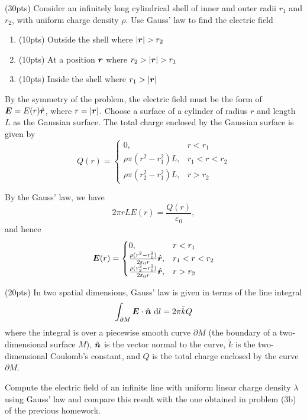\documentclass{article}
\begin{document}
\begin{problem}
(30pts) Consider an infinitely long cylindrical shell of inner and outer radii $r_1$ and $r_2$, with uniform charge density $\rho$. Use Gauss' law to find the electric field
\begin{enumerate}[label=(\alph*)]
    \item (10pts) Outside the shell where $|\boldsymbol{r}| > r_2$
    \item (10pts) At a position $\boldsymbol{r}$ where $r_2 > |\boldsymbol{r}| > r_1$
    \item (10pts) Inside the shell where $r_1 > |\boldsymbol{r}|$
\end{enumerate}
\end{problem}

\begin{solution}
  By the symmetry of the problem, the electric field must be the form of \( \boldsymbol{E}=E(r) \hat{\boldsymbol{r}} \), where \( r=|\boldsymbol{r}| \). Choose a surface of a cylinder of radius \( r \) and length \( L \) as the Gaussian surface. The total charge enclosed by the Gaussian surface is given by
  \[ Q(r)=\begin{cases}
    0,& r<r_1\\
    \rho\pi (r^2-r_1^2)L, & r_1<r<r_2\\
    \rho\pi (r_2^2-r_1^2)L, & r>r_2
  \end{cases} \]

  By the Gauss' law, we have
  \[ 2\pi r L E(r) = \frac{Q(r)}{\varepsilon_0}, \]
  and hence
  \[ \boldsymbol{E}(r) = \begin{cases}
    0, & r<r_1 \\
    \frac{\rho (r^2-r_1^2)}{2\varepsilon_0 r}\hat{\boldsymbol{r}}, & r_1<r<r_2 \\
    \frac{\rho (r_2^2-r_1^2)}{2\varepsilon_0 r}\hat{\boldsymbol{r}}, & r>r_2
  \end{cases} \]
\end{solution}



\begin{problem}
(20pts) In two spatial dimensions, Gauss' law is given in terms of the line integral
\[
\int_{\partial M} \boldsymbol{E} \cdot \hat{\boldsymbol{n}} \, \,\mathrm{d} l = 2\pi\tilde{k}Q
\]
where the integral is over a piecewise smooth curve $\partial M$ (the boundary of a two-dimensional surface $M$), $\hat{\boldsymbol{n}}$ is the vector normal to the curve, $\tilde{k}$ is the two-dimensional Coulomb's constant, and $Q$ is the total charge enclosed by the curve $\partial M$.

Compute the electric field of an infinite line with uniform linear charge density $\lambda$ using Gauss' law and compare this result with the one obtained in problem (3b) of the previous homework.
\end{problem}
\end{document}
